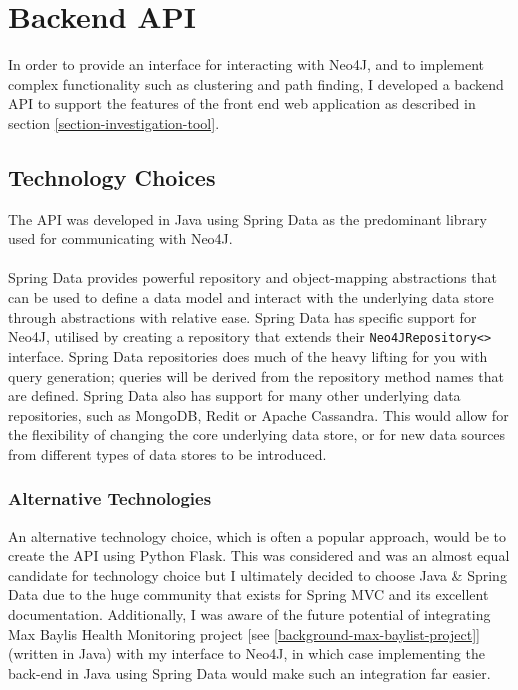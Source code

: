 \chapter{Backend API}\label{section-backend-api}
In order to provide an interface for interacting with Neo4J, and to implement complex functionality such as clustering and path finding, I developed a backend API to support the features of the front end web application as described in section \ref{section-investigation-tool}. 

\section{Technology Choices}
The API was developed in Java using Spring Data as the predominant library used for communicating with Neo4J. 
\\\\
Spring Data provides powerful repository and object-mapping abstractions that can be used to define a data model and interact with the underlying data store through abstractions with relative ease. Spring Data has specific support for Neo4J, utilised by creating a repository that extends their \texttt{Neo4JRepository<>} interface. Spring Data repositories does much of the heavy lifting for you with query generation; queries will be derived from the repository method names that are defined. Spring Data also has support for many other underlying data repositories, such as MongoDB, Redit or Apache Cassandra. This would allow for the flexibility of changing the core underlying data store, or for new data sources from different types of data stores to be introduced.

\subsection{Alternative Technologies}
An alternative technology choice, which is often a popular approach, would be to create the API using Python Flask. This was considered and was an almost equal candidate for technology choice but I ultimately decided to choose Java \& Spring Data due to the huge community that exists for Spring MVC and its excellent documentation. Additionally, I was aware of the future potential of integrating Max Baylis Health Monitoring project [see \ref{background-max-baylist-project}] (written in Java) with my interface to Neo4J, in which case implementing the back-end in Java using Spring Data would make such an integration far easier. 


